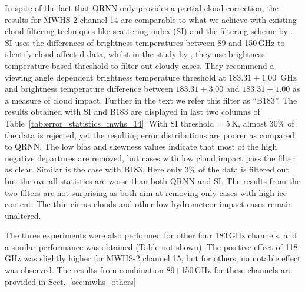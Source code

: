 \documentclass[amt, manuscript]{copernicus}
\begin{document}
In spite of the fact that QRNN only provides a partial cloud correction, the results for  MWHS-2 channel 14 are comparable to what we achieve with existing cloud filtering techniques like scattering index (SI) and the filtering scheme by \citet{buehler:aclou:07}. SI uses the differences of brightness temperatures between 89 and 150\,GHz to identify cloud affected data, whilst in the study by \citet{buehler:aclou:07}, they use brightness temperature based threshold to filter out cloudy cases. They recommend a viewing angle dependent brightness temperature threshold at $183.31\pm1.00$ \,GHz and brightness temperature difference between $183.31\pm3.00$ and $183.31\pm 1.00$ as a measure of cloud impact. Further in the text we refer this filter as ``B183''. The results obtained with SI and B183 are displayed in last two columns of Table~\ref{tab:error_statistics_mwhs_14}. With SI threshold = 5\,K, almost 30\% of the data is rejected, yet the resulting error distributions are poorer as compared to QRNN. The low bias and skewness values indicate that most of the high negative departures are removed, but cases with low cloud impact pass the filter as clear. Similar is the case with B183. Here only 3\% of the data is filtered out but the overall statistics are worse than both QRNN and SI. The results from the two filters are not surprising as both aim at removing only cases with high ice content. The thin cirrus clouds and other low hydrometeor impact cases remain unaltered.

The three experiments were also performed for other four 183\,GHz channels, and a similar performance was obtained (Table not shown). The positive effect of 118\,GHz was slightly higher for MWHS-2 channel 15, but for others, no notable effect was observed. The results from combination 89+150\,GHz for these channels are provided in Sect.~\ref{sec:mwhs_others} 
\end{document}
